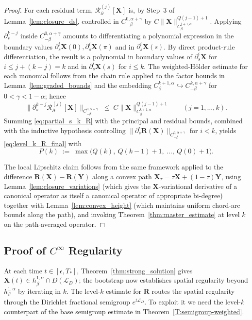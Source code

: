 \documentclass{amsart}
\begin{document}
\begin{proof}
For each residual term, $\mathcal{R}_\partial^{(j)}[\mathbf{X}]$ is, by Step~3 of Lemma~\ref{lem:closure_ds}, controlled in $C^{0,\alpha+\gamma}_{-\beta}$ by $C\|\mathbf{X}\|_{C^{j+1,\alpha}_\beta}^{Q(j-1)+1}$. Applying $\partial_s^{k-j}$ inside $C^{0,\alpha+\gamma}_{-\beta}$ amounts to differentiating a polynomial expression in the boundary values $\partial_s^i\mathbf{X}(0), \partial_s^i\mathbf{X}(\pi)$ and in $\partial_s^i\mathbf{X}(s)$. By direct product-rule differentiation, the result is a polynomial in boundary values of $\partial_s^i\mathbf{X}$ for $i \le j + (k-j) = k$ and in $\partial_s^i\mathbf{X}(s)$ for $i \le k$.  The weighted-Hölder estimate for each monomial follows from the chain rule applied to the factor bounds in Lemma~\ref{lem:graded_bounds} and the embedding $C^{k+1,\alpha}_\beta \hookrightarrow C^{k,\alpha+\gamma}_{-\beta}$ for $0 < \gamma < 1-\alpha$; hence
\[
\bigl\|\partial_s^{k-j}\mathcal{R}_\partial^{(j)}[\mathbf{X}]\bigr\|_{C^{0,\alpha+\gamma}_{-\beta}}
 \;\le\; C\|\mathbf{X}\|_{C^{k+1,\alpha}_\beta}^{Q(j-1)+1}
\qquad (j = 1, \ldots, k).
\]
Summing \eqref{eq:partial_s_k_R} with the principal and residual bounds, combined with the inductive hypothesis controlling $\|\partial_s^i\mathbf{R}(\mathbf{X})\|_{C^{0,\alpha+\gamma}_{-\beta}}$ for $i < k$, yields \eqref{eq:level_k_R_final} with
\[
P(k) \;:=\; \max\!\bigl(Q(k),\ Q(k-1)+1,\ \ldots,\ Q(0)+1\bigr).
\]

The local Lipschitz claim follows from the same framework applied to the difference $\mathbf{R}(\mathbf{X}) - \mathbf{R}(\mathbf{Y})$ along a convex path $\mathbf{X}_\tau = \tau\mathbf{X} + (1-\tau)\mathbf{Y}$, using Lemma~\ref{lem:closure_variations} (which gives the $\mathbf{X}$-variational derivative of a canonical operator as itself a canonical operator of appropriate bi-degree) together with Lemma~\ref{lem:convex_height} (which maintains uniform chord-arc bounds along the path), and invoking Theorem~\ref{thm:master_estimate} at level $k$ on the path-averaged operator.
\end{proof}

\subsection{Proof of $C^\infty$ Regularity}
\label{sec:proof_C_infty}

At each time $t \in [\epsilon, T_*]$, Theorem~\ref{thm:strong_solution} gives $\mathbf{X}(t) \in h^{1,\alpha}_\beta \cap D(\mathcal{L}_D)$; the bootstrap now establishes spatial regularity beyond $h^{1,\alpha}_\beta$ by iterating in $k$.  The level-$k$ estimate for $\mathbf{R}$ routes the spatial regularity through the Dirichlet fractional semigroup $e^{t\mathcal{L}_D}$.  To exploit it we need the level-$k$ counterpart of the base semigroup estimate in Theorem~\ref{T:semigroup-weighted}.
\end{document}

